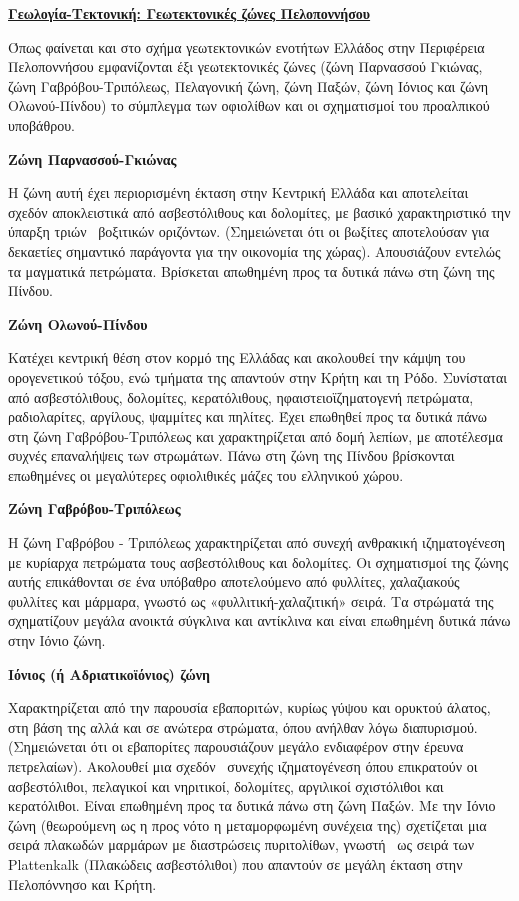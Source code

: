 \documentclass[12pt]{article}
\begin{document}
	\textbf {\underline{Γεωλογία-Τεκτονική: Γεωτεκτονικές ζώνες Πελοποννήσου}}
	
	Όπως φαίνεται και στο σχήμα γεωτεκτονικών ενοτήτων Ελλάδος στην Περιφέρεια Πελοποννήσου εμφανίζονται έξι γεωτεκτονικές ζώνες (ζώνη Παρνασσού Γκιώνας, ζώνη Γαβρόβου-Τριπόλεως, Πελαγονική ζώνη, ζώνη Παξών, ζώνη Ιόνιος και ζώνη Ολωνού-Πίνδου) το σύμπλεγμα των οφιολίθων και οι σχηματισμοί του προαλπικού υποβάθρου.
	
	\textbf{Ζώνη Παρνασσού-Γκιώνας}
	
	Η ζώνη αυτή έχει περιορισμένη έκταση στην Κεντρική Ελλάδα και αποτελείται σχεδόν αποκλειστικά από ασβεστόλιθους και δολομίτες, με βασικό χαρακτηριστικό την ύπαρξη τριών  βοξιτικών οριζόντων. (Σημειώνεται ότι οι βωξίτες αποτελούσαν για δεκαετίες σημαντικό παράγοντα για την οικονομία της χώρας). Απουσιάζουν εντελώς τα μαγματικά πετρώματα. Βρίσκεται απωθημένη προς τα δυτικά πάνω στη ζώνη της Πίνδου.
	
	\textbf{Ζώνη Ολωνού-Πίνδου}
	
	Κατέχει κεντρική θέση στον κορμό της Ελλάδας και ακολουθεί την κάμψη του ορογενετικού τόξου, ενώ τμήματα της απαντούν στην Κρήτη και τη Ρόδο. Συνίσταται από ασβεστόλιθους, δολομίτες, κερατόλιθους, ηφαιστειοϊζηματογενή πετρώματα, ραδιολαρίτες, αργίλους, ψαμμίτες και πηλίτες. Έχει επωθηθεί προς τα δυτικά πάνω στη ζώνη Γαβρόβου-Τριπόλεως και χαρακτηρίζεται από δομή λεπίων, με αποτέλεσμα συχνές επαναλήψεις των στρωμάτων. Πάνω στη ζώνη της Πίνδου βρίσκονται επωθημένες οι μεγαλύτερες οφιολιθικές μάζες του ελληνικού χώρου.
	
	\textbf{Ζώνη Γαβρόβου-Τριπόλεως}
	
	Η ζώνη Γαβρόβου - Τριπόλεως χαρακτηρίζεται από συνεχή ανθρακική ιζηματογένεση με κυρίαρχα πετρώματα τους ασβεστόλιθους και δολομίτες. Οι σχηματισμοί της ζώνης αυτής επικάθονται σε ένα υπόβαθρο αποτελούμενο από φυλλίτες, χαλαζιακούς φυλλίτες και μάρμαρα, γνωστό ως «φυλλιτική-χαλαζιτική» σειρά. Τα στρώματά της σχηματίζουν μεγάλα ανοικτά σύγκλινα και αντίκλινα και είναι επωθημένη δυτικά πάνω στην Ιόνιο ζώνη.
	
	\textbf{Ιόνιος (ή Αδριατικοϊόνιος) ζώνη}
	
	Χαρακτηρίζεται από την παρουσία εβαποριτών, κυρίως γύψου και ορυκτού άλατος, στη βάση της αλλά και σε ανώτερα στρώματα, όπου ανήλθαν λόγω διαπυρισμού. (Σημειώνεται ότι οι εβαπορίτες παρουσιάζουν μεγάλο ενδιαφέρον στην έρευνα πετρελαίων). Ακολουθεί μια σχεδόν  συνεχής ιζηματογένεση όπου επικρατούν οι ασβεστόλιθοι, πελαγικοί και νηριτικοί, δολομίτες, αργιλικοί σχιστόλιθοι και κερατόλιθοι. Είναι επωθημένη προς τα δυτικά πάνω στη ζώνη Παξών. Με την Ιόνιο ζώνη (θεωρούμενη ως η προς νότο η μεταμορφωμένη συνέχεια της) σχετίζεται μια σειρά πλακωδών μαρμάρων με διαστρώσεις πυριτολίθων, γνωστή  ως σειρά των Plattenkalk (Πλακώδεις ασβεστόλιθοι) που απαντούν σε μεγάλη έκταση στην Πελοπόννησο και Κρήτη.
	
\end{document}
